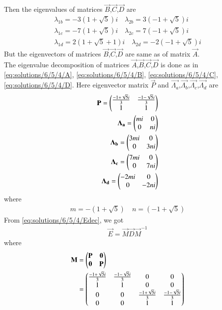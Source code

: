 Then the eigenvalues of matrices $\vec{B}$,$\vec{C}$,$\vec{D}$ are
\begin{align}
    \lambda_{1b}=-3(1+\sqrt{5})i\quad\lambda_{2b}=3(-1+\sqrt{5})i\label{eq:solutions/6/5/4/eigb}\\
    \lambda_{1c}=-7(1+\sqrt{5})i\quad\lambda_{2c}=7(-1+\sqrt{5})i\label{eq:solutions/6/5/4/eigc}\\
    \lambda_{1d}=2(1+\sqrt{5}+1)i\quad\lambda_{2d}=-2(-1+\sqrt{5})i\label{eq:solutions/6/5/4/eigd}
\end{align}
But the eigenvectors of matrices $\vec{B}$,$\vec{C}$,$\vec{D}$ are same as of matrix $\vec{A}$.\\
The eigenvalue decomposition of matrices $\vec{A}$,$\vec{B}$,$\vec{C}$,$\vec{D}$ is done as in \eqref{eq:solutions/6/5/4/A}, \eqref{eq:solutions/6/5/4/B}, \eqref{eq:solutions/6/5/4/C}, \eqref{eq:solutions/6/5/4/D}. Here eigenvector matrix $\vec{P}$ and $\vec{\Lambda_a}$,$\vec{\Lambda_b}$,$\vec{\Lambda_c}$,$\vec{\Lambda_d}$ are
\begin{align}
    \mathbf{P}=\begin{pmatrix}\frac{-1+\sqrt{5}i}{3}&\frac{-1-\sqrt{5}i}{3}\\1&1\end{pmatrix}\\
    \mathbf{\Lambda_a}=\begin{pmatrix}mi&0\\0&ni\end{pmatrix}\label{eq:solutions/6/5/4/exla}\\
    \mathbf{\Lambda_b}=\begin{pmatrix}3mi&0\\0&3ni\end{pmatrix}\label{eq:solutions/6/5/4/exlb}\\
    \mathbf{\Lambda_c}=\begin{pmatrix}7mi&0\\0&7ni\end{pmatrix}\label{eq:solutions/6/5/4/exlc}\\
    \mathbf{\Lambda_d}=\begin{pmatrix}-2mi&0\\0&-2ni\end{pmatrix}\label{eq:solutions/6/5/4/exld}
\end{align}
where
\begin{align}
    m=-(1+\sqrt{5})\quad n=(-1+\sqrt{5})\label{eq:solutions/6/5/4/mn}
\end{align}
From \eqref{eq:solutions/6/5/4/Edec}, we got
\begin{align}
    \vec{E}=\vec{M}\vec{D}\vec{M}^{-1}
\end{align}
where
\begin{align}
    \mathbf{M}&=\begin{pmatrix}\mathbf{P} & \mathbf{0}\\\mathbf{0} & \mathbf{P}\end{pmatrix}\\
    &=\begin{pmatrix}\frac{-1+\sqrt{5}i}{3}&\frac{-1-\sqrt{5}i}{3}&0&0\\1&1&0&0\\0&0&\frac{-1+\sqrt{5}i}{3}&\frac{-1-\sqrt{5}i}{3}\\0&0&1&1\end{pmatrix}
\end{align}
